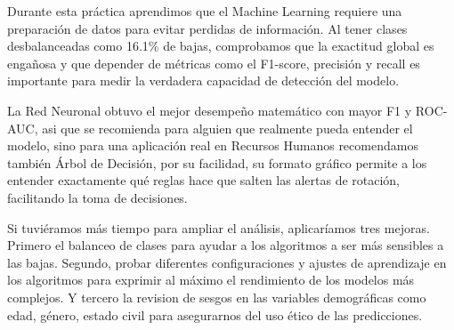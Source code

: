 \documentclass[letterpaper,11pt]{article}
\begin{document}
Durante esta práctica aprendimos que el Machine Learning requiere una preparación de datos para evitar perdidas de información. Al tener clases desbalanceadas como 16.1\% de bajas, comprobamos que la exactitud global es engañosa y que depender de métricas como el F1-score, precisión y recall es importante para medir la verdadera capacidad de detección del modelo.

La Red Neuronal obtuvo el mejor desempeño matemático con mayor F1 y ROC-AUC, asi que se recomienda para alguien que realmente pueda entender el modelo, sino para una aplicación real en Recursos Humanos recomendamos también Árbol de Decisión, por su facilidad, su formato gráfico permite a los entender exactamente qué reglas hace que salten las alertas de rotación, facilitando la toma de decisiones.

Si tuviéramos más tiempo para ampliar el análisis, aplicaríamos tres mejoras. Primero el balanceo de clases para ayudar a los algoritmos a ser más sensibles a las bajas. Segundo, probar diferentes configuraciones y ajustes de aprendizaje en los algoritmos para exprimir al máximo el rendimiento de los modelos más complejos. Y tercero la revision de sesgos en las variables demográficas como edad, género, estado civil para asegurarnos del uso ético de las predicciones.

\clearpage
{}
\begingroup
\makeatletter
\let\ps@plain\ps@referencias
\makeatother
\pagestyle{referencias}
\thispagestyle{referencias}
\renewcommand{\refname}{Fuentes utilizadas}
\nocite{referencia}


\clearpage
\endgroup
\end{document}
